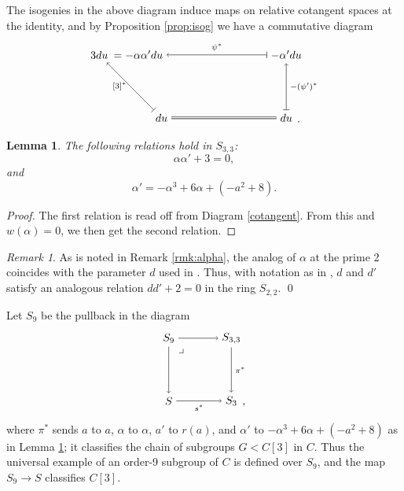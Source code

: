 \documentclass{gtpart}
\newtheorem{lem}[thm]{Lemma}
\theoremstyle{definition}
\theoremstyle{remark}
\newtheorem{rmk}[thm]{Remark}
\newcommand{\A}{\alpha}
\begin{document}
The isogenies in the above diagram induce maps on relative cotangent spaces at the identity, 
and by Proposition \ref{prop:isog} we have a commutative diagram 
\begin{equation}
\label{cotangent}
 \begin{tikzpicture}[baseline=(current bounding box.center)]
         \node (LT) at (0, 2) {$3 du$}; 
         \node (MT) at (1.25, 2) {$= -\A \A' du$}; 
         \node (RT) at (6, 2) {$-\A' du$}; 
         \node (LB) at (2, 0) {$du$}; 
         \node (RB) at (6, 0) {$du$}; 
         \node at (6.4, -0.125) {.}; 
         \draw [|->] (RT) -- node [above] {$\scriptstyle \psi^*$} (MT);
         \draw [|->] (LB) -- node [left] {$\scriptstyle [3]^*$} (LT); 
         \draw [|->] (RB) -- node [right] {$\scriptstyle -(\psi')^*$} (RT); 
         \draw [double distance=1.3pt] (LB) -- (RB); 
 \end{tikzpicture}
\end{equation}

\begin{lem}
\label{lem:-p}
 The following relations hold in $S_{3,3}$: 
 \[
  \A \A' + 3 = 0, 
 \]
 and 
 \[
  \A' = -\A^3 + 6 \A + (-a^2 + 8).  
 \]
\end{lem}
\begin{proof}
 The first relation is read off from Diagram \eqref{cotangent}.  From this and $w(\A) = 0$, we then get the second relation.  
\end{proof}
\begin{rmk}
 As is noted in Remark \ref{rmk:alpha}, the analog of $\A$ at the prime 2 coincides with the parameter $d$ used in \cite{h2p2}.  
 Thus, with notation as in \cite{h2p2}, $d$ and $d'$ satisfy an analogous relation $d d' + 2 = 0$ in the ring $S_{2,2}$.  
\qed
\end{rmk}

Let $S_9$ be the pullback in the diagram 
\begin{equation}
\label{S9}
 \begin{tikzpicture}[baseline=(current bounding box.center)]
         \node (LT) at (0, 2) {$S_9$}; 
         \node (RT) at (2, 2) {$S_{3,3}$}; 
         \node (LB) at (0, 0) {$S$}; 
         \node (RB) at (2, 0) {$S_3$}; 
         \node at (2.4, -0.125) {,}; 
         \node at (0.4, 1.6) {$\lrcorner$}; 
         \draw [->] (LT) --  (RT); 
         \draw [->] (LT) --  (LB); 
         \draw [->] (RT) -- node [right] {$\scriptstyle \pi^*$} (RB); 
         \draw [->] (LB) -- node [below] {$\scriptstyle s^*$} (RB); 
 \end{tikzpicture}
\end{equation}
where $\pi^*$ sends $a$ to $a$, $\A$ to $\A$, $a'$ to $r(a)$, and $\A'$ to $-\A^3 + 6 \A + (-a^2 + 8)$ as in Lemma \ref{lem:-p}; 
it classifies the chain of subgroups $G < C[3]$ in $C$.  Thus the universal example of an order-9 subgroup of $C$ 
is defined over $S_9$, and the map $S_9 \to S$ classifies $C[3]$.  
\end{document}
